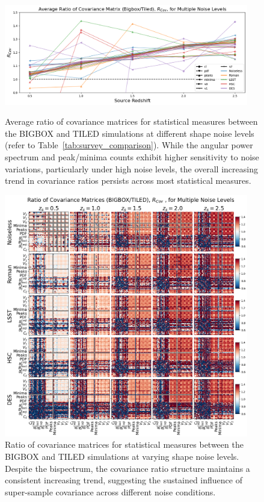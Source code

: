 \begin{figure}[p]
    \centering
    \includegraphics[width=0.95\textwidth]{figures/results/avg_cov_ratio_noise.png}
    \caption[Average BIGBOX/TILED Ratio of Covariance for Multiple Noise Levels]
    {Average ratio of covariance matrices for statistical measures between the BIGBOX and TILED simulations at different shape noise levels (refer to Table~\ref{tab:survey_comparison}). While the angular power spectrum and peak/minima counts exhibit higher sensitivity to noise variations, particularly under high noise levels, the overall increasing trend in covariance ratios persists across most statistical measures.}
    \label{fig:avg_cov_noise}
    \includegraphics[width=0.95\textwidth]{figures/results/cov_noise.png}
    \caption[BIGBOX/TILED Ratio of Covariance for Multiple Noise Levels]
    {Ratio of covariance matrices for statistical measures between the BIGBOX and TILED simulations at varying shape noise levels. Despite the bispectrum, the covariance ratio structure maintains a consistent increasing trend, suggesting the sustained influence of super-sample covariance across different noise conditions.}
    \label{fig:cov_noise}
\end{figure}

